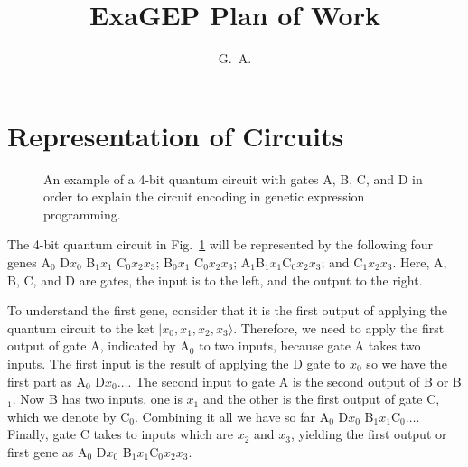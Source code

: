 \documentclass{article}
\begin{document}
	
\title{ExaGEP Plan of Work}

\author{G.~A.}

\maketitle

\section{Representation of Circuits}

\begin{figure}[h]
	\caption{\label{fig:circuit}
		An example of a 4-bit quantum circuit with gates A, B, C, and D in order
		to explain the circuit encoding in genetic expression programming.}
\end{figure}

The 4-bit quantum circuit in Fig.~\ref{fig:circuit} will be represented
by the following four genes A$_0$ D$x_0$  B$_1x_1$ C$_0x_2x_3$;
 B$_0x_1$ C$_0x_2x_3$; A$_1$B$_1x_1$C$_0x_2 x_3$; and C$_1x_2x_3$.
Here, A, B, C, and D are gates, the input is to the left, and the output to the right.


To understand the first gene, consider that it is the first output of applying
the quantum circuit to the ket $|x_0, x_1, x_2, x_3\rangle$. Therefore, we need
to apply the first output of gate A, indicated by A$_0$ to two inputs, because
gate A takes two inputs. The first input is the result of applying the D gate
to $x_0$ so we have the first part as A$_0$ D$x_0\ldots$. The second input to gate
A is the second output of B or B$_1$. Now B has two inputs, one is $x_1$ and the other is
the first output of gate C, which we denote by C$_0$. Combining it all we have so far
A$_0$ D$x_0$ B$_1x_1$C$_0\ldots$. Finally, gate C takes to inputs which are $x_2$ and $x_3$,
yielding the first output or first gene as A$_0$ D$x_0$ B$_1x_1$C$_0x_2x_3$.
\end{document}
